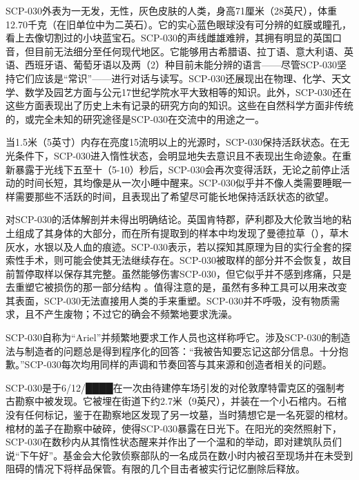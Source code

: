 SCP-030外表为一无发，无性，灰色皮肤的人类，身高71厘米（28英尺），体重12.70千克（在旧单位中为二英石）。它的实心蓝色眼球没有可分辨的虹膜或瞳孔，看上去像切割过的小块蓝宝石。SCP-030的声线雌雄难辨，其拥有明显的英国口音，但目前无法细分至任何现代地区。它能够用古希腊语、拉丁语、意大利语、英语、西班牙语、葡萄牙语以及两（2）种目前未能分辨的语言——尽管SCP-030坚持它们应该是“常识”——进行对话与读写。SCP-030还展现出在物理、化学、天文学、数学及园艺方面与公元17世纪学院水平大致相等的知识。此外，SCP-030还在这些方面表现出了历史上未有记录的研究方向的知识。这些在自然科学方面非传统的，或完全未知的研究途径是SCP-030在交流中的用途之一。

当1.5米（5英寸）内存在亮度15流明以上的光源时，SCP-030保持活跃状态。在无光条件下，SCP-030进入惰性状态，会明显地失去意识且不表现出生命迹象。在重新暴露于光线下五至十（5-10）秒后，SCP-030会再次变得活跃，无论之前停止活动的时间长短，其均像是从一次小睡中醒来。SCP-030似乎并不像人类需要睡眠一样需要那些不活跃的时间，且表现出了希望尽可能长地保持活跃状态的欲望。

对SCP-030的活体解剖并未得出明确结论。英国肯特郡，萨利郡及大伦敦当地的粘土组成了其身体的大部分，而在所有提取到的样本中均发现了曼德拉草（），草木灰水，水银以及人血的痕迹。SCP-030表示，若以探知其原理为目的实行全套的探索性手术，则可能会使其无法继续存在。SCP-030被取样的部分并不会恢复，故目前暂停取样以保存其完整。虽然能够伤害SCP-030，但它似乎并不感到疼痛，只是去重塑它被损伤的那一部分结构 。值得注意的是，虽然有多种工具可以用来改变其表面，SCP-030无法直接用人类的手来重塑。SCP-030并不呼吸，没有物质需求，且不产生废物；不过它的确会不频繁地要求洗澡。

SCP-030自称为“Ariel”并频繁地要求工作人员也这样称呼它。涉及SCP-030的制造法与制造者的问题总是得到程序化的回答：“我被告知要忘记这部分信息。十分抱歉。”SCP-030每次均用同样的声调和节奏回答与其来源和创造者相关的问题。

SCP-030是于6\slash 12\slash ████在一次由待建停车场引发的对伦敦摩特雷克区的强制考古勘察中被发现。它被埋在街道下约2.7米（9英尺），并装在一个小石棺内。石棺没有任何标记，鉴于在勘察地区发现了另一坟墓，当时猜想它是一名死婴的棺材。棺材的盖子在勘察中破碎，使得SCP-030暴露在日光下。在阳光的突然照射下，SCP-030在数秒内从其惰性状态醒来并作出了一个温和的举动，即对建筑队员们说“下午好”。基金会大伦敦侦察部队的一名成员在数小时内被召至现场并在未受到阻碍的情况下将样品保管。有限的几个目击者被实行记忆删除后释放。




